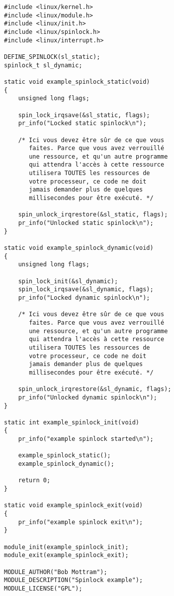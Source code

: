 \documentclass[11pt]{article}
\begin{document}
\begin{verbatim}
#include <linux/kernel.h>
#include <linux/module.h>
#include <linux/init.h>
#include <linux/spinlock.h>
#include <linux/interrupt.h>

DEFINE_SPINLOCK(sl_static);
spinlock_t sl_dynamic;

static void example_spinlock_static(void)
{
    unsigned long flags;

    spin_lock_irqsave(&sl_static, flags);
    pr_info("Locked static spinlock\n");

    /* Ici vous devez être sûr de ce que vous
       faites. Parce que vous avez verrouillé
       une ressource, et qu'un autre programme
       qui attendra l'accès à cette ressource
       utilisera TOUTES les ressources de
       votre processeur, ce code ne doit
       jamais demander plus de quelques
       millisecondes pour être exécuté. */

    spin_unlock_irqrestore(&sl_static, flags);
    pr_info("Unlocked static spinlock\n");
}

static void example_spinlock_dynamic(void)
{
    unsigned long flags;

    spin_lock_init(&sl_dynamic);
    spin_lock_irqsave(&sl_dynamic, flags);
    pr_info("Locked dynamic spinlock\n");

    /* Ici vous devez être sûr de ce que vous
       faites. Parce que vous avez verrouillé
       une ressource, et qu'un autre programme
       qui attendra l'accès à cette ressource
       utilisera TOUTES les ressources de
       votre processeur, ce code ne doit
       jamais demander plus de quelques
       millisecondes pour être exécuté. */

    spin_unlock_irqrestore(&sl_dynamic, flags);
    pr_info("Unlocked dynamic spinlock\n");
}

static int example_spinlock_init(void)
{
    pr_info("example spinlock started\n");

    example_spinlock_static();
    example_spinlock_dynamic();

    return 0;
}

static void example_spinlock_exit(void)
{
    pr_info("example spinlock exit\n");
}

module_init(example_spinlock_init);
module_exit(example_spinlock_exit);

MODULE_AUTHOR("Bob Mottram");
MODULE_DESCRIPTION("Spinlock example");
MODULE_LICENSE("GPL");
\end{verbatim}
\end{document}
